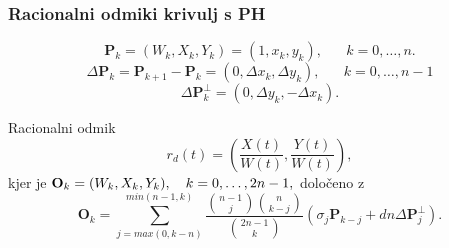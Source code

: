 \documentclass[12pt]{beamer}
\theoremstyle{definition} %
\theoremstyle{plain} %
\begin{document}


	
	
	

\begin{frame}
	\frametitle{Racionalni odmiki krivulj s PH}
\pause
$$\textbf{P}_k = (W_k, X_k, Y_k) = (1, x_k, y_k),\hspace{20pt} k = 0,\ldots , n.$$
$$\Delta\textbf{P}_k = \textbf{P}_{k + 1} - \textbf{P}_k = (0, \Delta x_k, \Delta y_k),\hspace{20pt} k = 0,\ldots, n - 1$$
$$\Delta\textbf{P}_k^\perp = (0, \Delta y_k, -\Delta x_k).$$
\pause
\begin{block}{Racionalni odmik}
$$r_d (t) = \left(\frac{X (t)}{W(t)},\frac{Y(t)}{W(t)}\right),$$
kjer je $\textbf{O}_k = (W_k, X_k, Y_k), \hspace{10px} k = 0,\ldots , 2n - 1,$ določeno z
$$\textbf{O}_k =\sum^{min (n - 1, k)}_{j = max (0, k - n)}\frac{\binom{n-1}{j}\binom{n}{k-j}}{\binom{2n-1}{k}}(\sigma_j\textbf{P}_{k-j}+dn\Delta\textbf{P}_j^\perp).$$
\end{block}
\end{frame}
\end{document}
